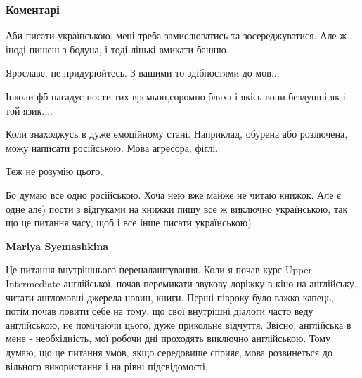  
 
 
 
 
\subsubsection{Коментарі}
\label{sec:04_10_2021.fb.gorovyj_ruslan.1.jazyk_posty_facebook.cmt}

\begin{itemize} %

Аби писати українською, мені треба замислюватись та зосереджуватися. Але ж
іноді пишеш з бодуна, і тоді лінькі вмикати башню.

\begin{itemize} %
Ярославе, не придурюйтесь. З вашими то здібностями до мов...
\end{itemize} %

Інколи фб нагадує пости тих врємьон,соромно бляха і якісь вони бездушні як і той язик....

Коли знаходжусь в дуже емоційному стані. Наприклад, обурена або розлючена, можу написати російською. Мова агресора, фіглі.

Теж не розумію цього.


Бо думаю все одно російською. Хоча нею вже майже не читаю книжок. Але є одне
але) пости з відгуками на книжки пишу все ж виключно українською, так що це
питання часу, щоб і все інше писати українською)

\begin{itemize} %
\textbf{Mariya Syemashkina} 

Це питання внутрішнього переналаштування. Коли я почав курс Upper Intermediate
англійської, почав перемикати звукову доріжку в кіно на англійську, читати
англомовні джерела новин, книги. Перші півроку було важко капець, потім почав
ловити себе на тому, що свої внутрішні діалоги часто веду англійською, не
помічаючи цього, дуже прикольне відчуття. Звісно, англійська в мене -
необхідність, мої робочи дні проходять виключно англійською. Тому думаю, що це
питання умов, якщо середовище сприяє, мова розвинеться до вільного використання
і на рівні підсвідомості.



\end{itemize}
\end{itemize}
